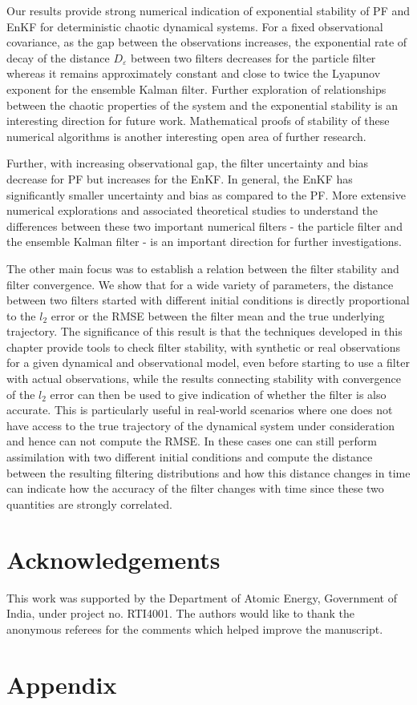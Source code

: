 Our results provide strong numerical indication of exponential stability of PF and EnKF for deterministic chaotic dynamical systems. For a fixed observational covariance, as the gap between the observations increases, the exponential rate of decay of the distance $D_\varepsilon$ between two filters decreases for the particle filter whereas it remains approximately constant and close to twice the Lyapunov exponent for the ensemble Kalman filter. {\color{mypink} Further exploration of relationships between the chaotic properties of the system and the exponential stability is an interesting direction for future work.} Mathematical proofs of stability of these numerical algorithms is another interesting open area of further research.

Further, with increasing observational gap, the filter uncertainty and bias decrease for PF but increases for the EnKF. In general, the EnKF has significantly smaller uncertainty and bias as compared to the PF. More extensive numerical explorations and associated theoretical studies to understand the differences between these two important numerical filters - the particle filter and the ensemble Kalman filter - is an important direction for further investigations.

The other main focus was to establish a relation between the filter stability and filter convergence. We show that for a wide variety of parameters, the distance between two filters started with different initial conditions is directly proportional to the $l_2$ error or the RMSE between the filter mean and the true underlying trajectory. The significance of this result is that the techniques developed in this chapter provide tools to check filter stability, with synthetic or real observations for a given dynamical and observational model, even before starting to use a filter with actual observations, while the results connecting stability with convergence of the $l_2$ error can then be used to give indication of whether the filter is also accurate. This is particularly useful in real-world scenarios where one does not have access to the true trajectory of the dynamical system under consideration and hence can not compute the RMSE. In these cases one can still perform assimilation with two different initial conditions and compute the distance between the resulting filtering distributions and how this distance changes in time can indicate how the accuracy of the filter changes with time since these two quantities are strongly correlated. 

\section*{Acknowledgements}
This work was supported by the Department of Atomic Energy, Government of India, under project no. RTI4001. The authors would like to thank the anonymous referees for the comments which helped improve the manuscript.

\section{Appendix}\label{sec-append--probing-nfs}





